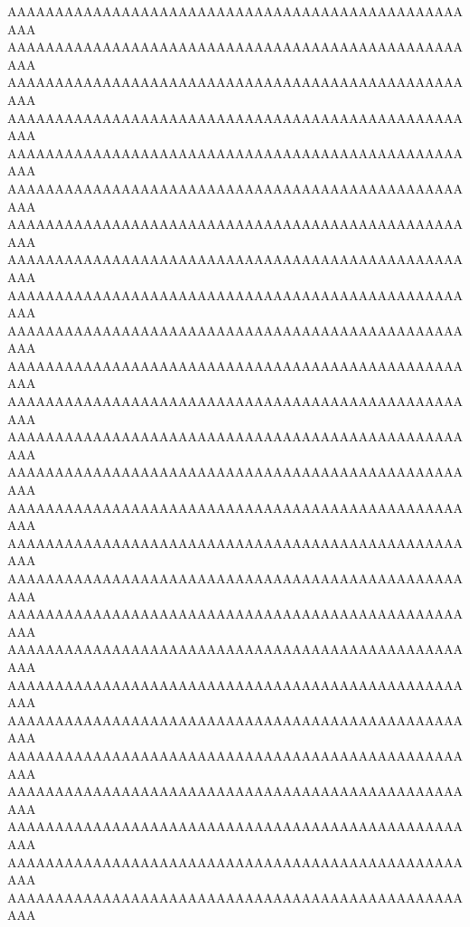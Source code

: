 \documentclass[final,11pt,baselinegrid]{../../uit-thesis}
\begin{document}
AAAAAAAAAAAAAAAAAAAAAAAAAAAAAAAAAAAAAAAAAAAAAAAAAAA\newline
AAAAAAAAAAAAAAAAAAAAAAAAAAAAAAAAAAAAAAAAAAAAAAAAAAA\newline
AAAAAAAAAAAAAAAAAAAAAAAAAAAAAAAAAAAAAAAAAAAAAAAAAAA\newline
AAAAAAAAAAAAAAAAAAAAAAAAAAAAAAAAAAAAAAAAAAAAAAAAAAA\newline
AAAAAAAAAAAAAAAAAAAAAAAAAAAAAAAAAAAAAAAAAAAAAAAAAAA\newline
AAAAAAAAAAAAAAAAAAAAAAAAAAAAAAAAAAAAAAAAAAAAAAAAAAA\newline
AAAAAAAAAAAAAAAAAAAAAAAAAAAAAAAAAAAAAAAAAAAAAAAAAAA\newline
AAAAAAAAAAAAAAAAAAAAAAAAAAAAAAAAAAAAAAAAAAAAAAAAAAA\newline
AAAAAAAAAAAAAAAAAAAAAAAAAAAAAAAAAAAAAAAAAAAAAAAAAAA\newline
AAAAAAAAAAAAAAAAAAAAAAAAAAAAAAAAAAAAAAAAAAAAAAAAAAA\newline
%
AAAAAAAAAAAAAAAAAAAAAAAAAAAAAAAAAAAAAAAAAAAAAAAAAAA\newline
AAAAAAAAAAAAAAAAAAAAAAAAAAAAAAAAAAAAAAAAAAAAAAAAAAA\newline
AAAAAAAAAAAAAAAAAAAAAAAAAAAAAAAAAAAAAAAAAAAAAAAAAAA\newline
AAAAAAAAAAAAAAAAAAAAAAAAAAAAAAAAAAAAAAAAAAAAAAAAAAA\newline
AAAAAAAAAAAAAAAAAAAAAAAAAAAAAAAAAAAAAAAAAAAAAAAAAAA\newline
AAAAAAAAAAAAAAAAAAAAAAAAAAAAAAAAAAAAAAAAAAAAAAAAAAA\newline
AAAAAAAAAAAAAAAAAAAAAAAAAAAAAAAAAAAAAAAAAAAAAAAAAAA\newline
AAAAAAAAAAAAAAAAAAAAAAAAAAAAAAAAAAAAAAAAAAAAAAAAAAA\newline
AAAAAAAAAAAAAAAAAAAAAAAAAAAAAAAAAAAAAAAAAAAAAAAAAAA\newline
AAAAAAAAAAAAAAAAAAAAAAAAAAAAAAAAAAAAAAAAAAAAAAAAAAA\newline
AAAAAAAAAAAAAAAAAAAAAAAAAAAAAAAAAAAAAAAAAAAAAAAAAAA\newline
AAAAAAAAAAAAAAAAAAAAAAAAAAAAAAAAAAAAAAAAAAAAAAAAAAA\newline
AAAAAAAAAAAAAAAAAAAAAAAAAAAAAAAAAAAAAAAAAAAAAAAAAAA\newline
AAAAAAAAAAAAAAAAAAAAAAAAAAAAAAAAAAAAAAAAAAAAAAAAAAA\newline
AAAAAAAAAAAAAAAAAAAAAAAAAAAAAAAAAAAAAAAAAAAAAAAAAAA\newline
AAAAAAAAAAAAAAAAAAAAAAAAAAAAAAAAAAAAAAAAAAAAAAAAAAA\newline
\end{document}
